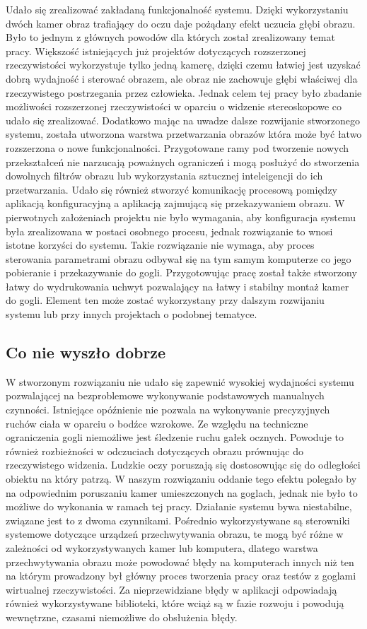 \documentclass[a4paper,11pt,twoside]{report}
\theoremstyle{definition}
\begin{document}
Udało się zrealizować zakładaną funkcjonalność systemu. Dzięki wykorzystaniu dwóch kamer obraz trafiający do oczu daje pożądany efekt uczucia głębi obrazu. Było to jednym z głównych powodów dla których został zrealizowany temat pracy. Większość istniejących już projektów dotyczących rozszerzonej rzeczywistości wykorzystuje tylko jedną kamerę, dzięki czemu łatwiej jest uzyskać dobrą wydajność i sterować obrazem, ale obraz nie zachowuje głębi właściwej dla rzeczywistego postrzegania przez człowieka. Jednak celem tej pracy było zbadanie możliwości rozszerzonej rzeczywistości w oparciu o widzenie stereoskopowe co udało się zrealizować. Dodatkowo mając na uwadze dalsze rozwijanie stworzonego systemu, została utworzona warstwa przetwarzania obrazów która może być łatwo rozszerzona o nowe funkcjonalności. Przygotowane ramy pod tworzenie nowych przekształceń nie narzucają poważnych ograniczeń i mogą posłużyć do stworzenia dowolnych filtrów obrazu lub wykorzystania sztucznej inteleigencji do ich przetwarzania. Udało się również stworzyć komunikację procesową pomiędzy aplikacją konfiguracyjną a aplikacją zajmującą się przekazywaniem obrazu. W pierwotnych założeniach projektu nie było wymagania, aby konfiguracja systemu była zrealizowana w postaci osobnego procesu, jednak rozwiązanie to wnosi istotne korzyści do systemu. Takie rozwiązanie nie wymaga, aby proces sterowania parametrami obrazu odbywał się na tym samym komputerze co jego pobieranie i przekazywanie do gogli. Przygotowując pracę został także stworzony łatwy do wydrukowania uchwyt pozwalający na łatwy i stabilny montaż kamer do gogli. Element ten może zostać wykorzystany przy dalszym rozwijaniu systemu lub przy innych projektach o podobnej tematyce.

\subsection{Co nie wyszło dobrze}

W stworzonym rozwiązaniu nie udało się zapewnić wysokiej wydajności systemu pozwalającej na bezproblemowe wykonywanie podstawowych manualnych czynności. Istniejące opóźnienie nie pozwala na wykonywanie precyzyjnych ruchów ciała w oparciu o bodźce wzrokowe.  Ze względu na techniczne ograniczenia gogli niemożliwe jest śledzenie ruchu gałek ocznych. Powoduje to również rozbieżności w odczuciach dotyczących obrazu prównując do rzeczywistego widzenia. Ludzkie oczy poruszają się dostosowując się do odległości obiektu na który patrzą. W naszym rozwiązaniu oddanie tego efektu polegało by na odpowiednim poruszaniu kamer umieszczonych na goglach, jednak nie było to możliwe do wykonania w ramach tej pracy. Działanie systemu bywa niestabilne, związane jest to z dwoma czynnikami. Pośrednio wykorzystywane są sterowniki systemowe dotyczące urządzeń przechwytywania obrazu, te mogą być różne w zależności od wykorzystywanych kamer lub komputera, dlatego warstwa przechwytywania obrazu może powodować błędy na komputerach innych niż ten na którym prowadzony był główny proces tworzenia pracy oraz testów z goglami wirtualnej rzeczywistości. Za nieprzewidziane błędy w aplikacji odpowiadają również wykorzystywane biblioteki, które wciąż są w fazie rozwoju i powodują wewnętrzne, czasami niemożliwe do obsłużenia błędy.
\end{document}
